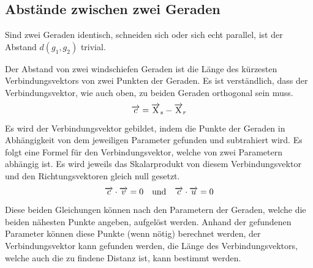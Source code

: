 \documentclass{article}
\begin{document}
\subsection{Abstände zwischen zwei Geraden}
Sind zwei Geraden identisch, schneiden sich oder sich echt parallel, ist der Abstand $d(g_1, g_2)$ trivial. 
 
Der Abstand von zwei windschiefen Geraden ist die Länge des kürzesten Verbindungsvektors von zwei Punkten der Geraden. Es ist verständlich, dass der Verbindungsvektor, wie auch oben, zu beiden Geraden orthogonal sein muss.
\[
 \overrightarrow{c} = \overrightarrow{\mathrm{X}}_s - \overrightarrow{\mathrm{X}}_r 
\]  
Es wird der Verbindungsvektor gebildet, indem die Punkte der Geraden in Abhängigkeit von dem jeweiligen Parameter gefunden und subtrahiert wird. Es folgt eine Formel für den Verbindungsvektor, welche von zwei Parametern abhängig ist. Es wird jeweils das Skalarprodukt von diesem Verbindungsvektor und den Richtungsvektoren gleich null gesetzt.
\[
 \overrightarrow{c} \cdot \overrightarrow{v} = 0
 \quad \text{und} \quad
 \overrightarrow{c} \cdot \overrightarrow{u} = 0
\] 
Diese beiden Gleichungen können nach den Parametern der Geraden, welche die beiden nähesten Punkte angeben, aufgelöst werden. Anhand der gefundenen Parameter können diese Punkte (wenn nötig) berechnet werden, der Verbindungsvektor kann gefunden werden, die Länge des Verbindungsvektors, welche auch die zu findene Distanz ist, kann bestimmt werden.
 
 
\end{document}
